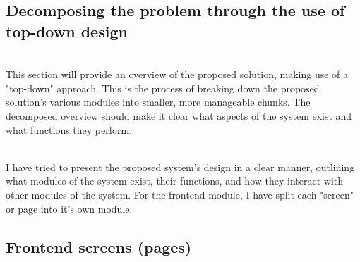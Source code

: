 \documentclass[../../main.tex]{subfiles}
\begin{document}
\begin{comment}
\node (home_details) [mb_node, below of=home, xshift=2.5cm] {System information};
\node (home_stats) [mb_node, below of=home_details, xshift=-0.4cm] {Usage statistics};

\node (item_photo) [mb_node, below of=item, xshift=2cm] {Photo(s) card};
\node (item_check) [mb_node, below of=item_photo] {Check in/out};
\node (item_entity) [mb_node, below of=item_check] {Entity list};
\node (item_history) [mb_node, below of=item_entity] {Entity history};

\node (entity_check) [mb_node, below of=entity, xshift=2cm] {Check in/out};
\node (entity_history) [mb_node, below of=entity_check] {History};

\end{comment}

\subsection{Decomposing the problem through the use of top-down design}

\noindent \\ This section will provide an overview of the proposed solution,
making use of a "top-down" approach. This is the process of breaking down the proposed
solution's various modules into smaller, more manageable chunks.
The decomposed overview should make it clear what aspects of the system exist and what
functions they perform.

\noindent \\ I have tried to present the proposed system's design in a clear manner,
outlining what modules of the system exist, their functions, and how they interact
with other modules of the system. For the frontend module, I have split each "screen" or page into it's
own module.

\subsection{Frontend screens (pages)}

\end{document}
